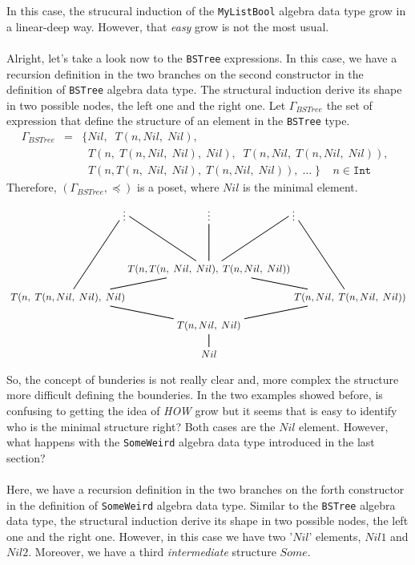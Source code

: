 \documentclass{report}
\theoremstyle{definition}
\theoremstyle{definition}
\newcommand{\ttt}[1]{\texttt{#1}}
\newcommand{\tav}{\;\;}
\begin{document}
In this case, the strucural induction of the \ttt{MyListBool} algebra data type grow in a linear-deep way. However, that \textit{easy} grow is not the most usual.\\\\
Alright, let's take a look now to the \ttt{BSTree} expressions. In this case, we have a recursion definition in the two branches on the second constructor in the definition of \ttt{BSTree} algebra data type. The structural induction derive its shape in two possible nodes, the left one and the right one. Let $\Gamma_{BSTree}$ the set of expression that define the structure of an element in the \ttt{BSTree} type.
\begin{eqnarray*}
	\Gamma_{BSTree} & = & \{ Nil, \tav T(n, Nil, \; Nil), \\
					&& \tav T(n, \; T(n, Nil, \; Nil), \; Nil), \tav T(n, Nil, \; T(n, Nil, \; Nil)), \tav  \\
					&& \tav T(n, T(n, \; Nil, \; Nil), \; T(n, Nil, \; Nil)), \; \ldots \; \} \tav \tav n \in \ttt{Int}
\end{eqnarray*}
Therefore, $(\Gamma_{BSTree}, \preceq)$ is a poset, where $Nil$ is the minimal element.
\begin{align*}
	\begin{tikzpicture}
		\node (a3) at (3,4) {$\vdots$};
		\node (a2) at (0,4) {$\vdots$};
		\node (a1) at (-3,4) {$\vdots$};
		\node (c2) at (0,2) {$T(n, T(n, \; Nil, \; Nil), \; T(n, Nil, \; Nil))$};
		\node (c3) at (5,1) {$T(n, Nil, \; T(n, Nil, \; Nil))$};
		\node (c1) at (-5,1) {$T(n, \; T(n, Nil, \; Nil), \; Nil)$};
		\node (d) at (0,0) {$T(n, Nil, \; Nil)$};
		\node (min) at (0,-1) {$Nil$};
		\draw [thick](min) -- (d) -- (c1) -- (c2) -- (a2);
		\draw [thick](c1) -- (a1);
		\draw [thick](c3) -- (a3);
		\draw [thick](c2) -- (a3);
		\draw [thick](d) -- (c3) -- (c2) -- (a1);
	\end{tikzpicture}
\end{align*}
So, the concept of bunderies is not really clear and, more complex the structure more difficult defining the bounderies. In the two examples showed before, is confusing to getting the idea of \textit{HOW} grow but it seems that is easy to identify who is the minimal structure right? Both cases are the $Nil$ element. However, what happens with the \ttt{SomeWeird} algebra data type introduced in the last section?\\\\
Here, we have a recursion definition in the two branches on the forth constructor in the definition of \ttt{SomeWeird} algebra data type. Similar to the \ttt{BSTree} algebra data type, the structural induction derive its shape in two possible nodes, the left one and the right one. However, in this case we have two '$Nil$' elements, $Nil1$ and $Nil2$. Moreover, we have a third \textit{intermediate} structure $Some$.\\\\
\end{document}
